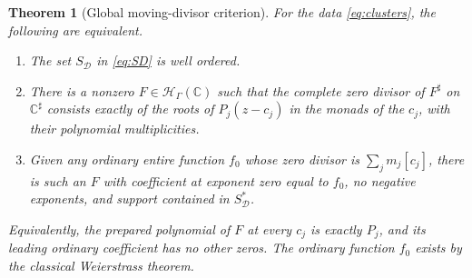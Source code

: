 \documentclass[11pt,letterpaper]{article}
\newtheorem{theorem}{Theorem}[section]
\theoremstyle{definition}
\theoremstyle{remark}
\newcommand{\C}{\mathbb C}
\newcommand{\HH}{\mathscr H_\Gamma}
\newcommand{\sh}{^{\sharp}}
\numberwithin{equation}{section}
\begin{document}
\begin{theorem}[Global moving-divisor criterion]\label{thm:divisor}
For the data \eqref{eq:clusters}, the following are equivalent.
\begin{enumerate}
\item The set $S_{\mathcal D}$ in \eqref{eq:SD} is well ordered.
\item There is a nonzero $F\in\HH(\C)$ such that the complete zero divisor of $F\sh$ on $\C\sh$ consists exactly of the roots of $P_j(z-c_j)$ in the monads of the $c_j$, with their polynomial multiplicities.
\item Given any ordinary entire function $f_0$ whose zero divisor is $\sum_j m_j[c_j]$, there is such an $F$ with coefficient at exponent zero equal to $f_0$, no negative exponents, and support contained in $S_{\mathcal D}^*$.
\end{enumerate}
Equivalently, the prepared polynomial of $F$ at every $c_j$ is exactly $P_j$, and its leading ordinary coefficient has no other zeros. The ordinary function $f_0$ exists by the classical Weierstrass theorem.
\end{theorem}
\end{document}
